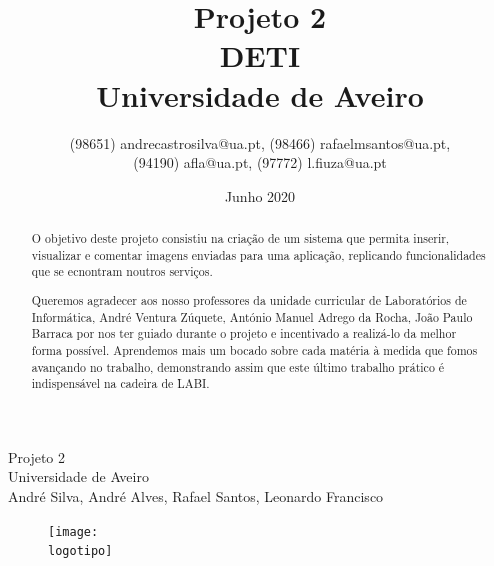 \documentclass{report}
\begin{document}
%
\def\titulo{Projeto 2}
\def\data{Junho 2020}
\def\autores{André Silva, André Alves, Rafael Santos, Leonardo Francisco}
\def\autorescontactos{(98651) andrecastrosilva@ua.pt, (98466) rafaelmsantos@ua.pt, (94190) afla@ua.pt, (97772) l.fiuza@ua.pt }
\def\departamento{DETI}
\def\empresa{Universidade de Aveiro}
\def\logotipo{ua.png}
%
%
\begin{titlepage}

\begin{center}
%
\vspace*{50mm}
%
{\Huge \titulo}\\ 
%
\vspace{10mm}
%
{\Large \empresa}\\
%
\vspace{10mm}
%
{\LARGE \autores}\\ 
%
\vspace{30mm}
%
\begin{figure}[h]
\center
\texttt{[image: \\logotipo]}
\end{figure}
%
\vspace{30mm}
\end{center}
%
\end{titlepage}

\title{%
{\Huge\textbf{\titulo}}\\
{\Large \departamento\\ \empresa}
}
%

\author{
(98651) andrecastrosilva@ua.pt, (98466) rafaelmsantos@ua.pt, \\ (94190) afla@ua.pt, (97772) l.fiuza@ua.pt
}
%
\date{\data}
%
\maketitle


\begin{abstract}
\par O objetivo deste projeto consistiu na criação de um sistema que permita inserir, visualizar e comentar imagens enviadas para uma aplicação, replicando funcionalidades que se ecnontram noutros serviços. \par


\end{abstract}

\renewcommand{\abstractname}{Agradecimentos}
\begin{abstract}
\par Queremos agradecer aos nosso professores da unidade curricular de Laboratórios de Informática, André Ventura Zúquete, António Manuel Adrego da Rocha, João Paulo Barraca por nos ter guiado durante o projeto e incentivado a realizá-lo da melhor forma possível. Aprendemos mais um bocado sobre cada matéria à medida que fomos avançando no trabalho, demonstrando assim que este último trabalho prático é indispensável na cadeira de LABI.

\end{abstract}
\end{document}
